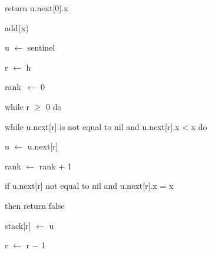 \documentclass[12pt]{article}
\renewcommand{\_}{\kern-1.5pt\textunderscore\kern-1.5pt}
\begin{document}
\begin{adjustwidth}{0.5in}{0.0in}
return u.next[0].x\par

\end{adjustwidth}

add(x) \par

u $ \leftarrow $  sentinel\par

r $ \leftarrow $  h\par

rank\  $ \leftarrow $  0\par

while r $ \geq $  0 do \par

\begin{adjustwidth}{0.5in}{0.0in}
while u.next[r] is not equal to nil and u.next[r].x < x do \par

\end{adjustwidth}

\begin{adjustwidth}{1.0in}{0.0in}
u $ \leftarrow $  u.next[r] \par

\end{adjustwidth}

\begin{adjustwidth}{1.0in}{0.0in}
rank $ \leftarrow $  rank + 1\par

\end{adjustwidth}

\begin{adjustwidth}{0.5in}{0.0in}
if u.next[r] not equal to nil and u.next[r].x = x \par

\end{adjustwidth}

\begin{adjustwidth}{1.5in}{0.0in}
then return false \par

\end{adjustwidth}

\begin{adjustwidth}{0.5in}{0.0in}
stack[r] $ \leftarrow $  u\par

\end{adjustwidth}

\begin{adjustwidth}{0.5in}{0.0in}
r $ \leftarrow $  r $-$  1 \par

\end{adjustwidth}
\end{document}
